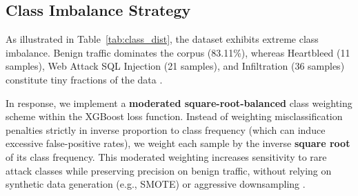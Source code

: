 \documentclass[conference]{IEEEtran}
\begin{document}
\subsection{Class Imbalance Strategy}
As illustrated in Table~\ref{tab:class_dist}, the dataset exhibits 
extreme class imbalance. Benign traffic dominates the corpus (83.11\%), 
whereas Heartbleed (11 samples), Web Attack SQL Injection (21 samples), 
and Infiltration (36 samples) constitute tiny fractions of the data 
\cite{c15}.

In response, we implement a \textbf{moderated square-root-balanced} 
class weighting scheme within the XGBoost loss function. Instead of 
weighting misclassification penalties strictly in inverse proportion 
to class frequency (which can induce excessive false-positive rates), 
we weight each sample by the inverse \textbf{square root} of its class 
frequency. This moderated weighting increases sensitivity to rare 
attack classes while preserving precision on benign traffic, without 
relying on synthetic data generation (e.g., SMOTE) or aggressive 
downsampling \cite{c16,c17}.
\end{document}
